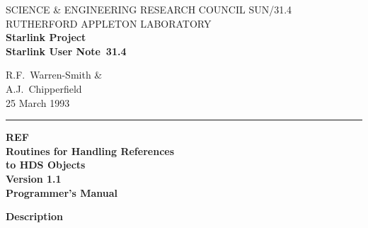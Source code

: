 \pagestyle{headings}

\newcommand{\stardoccategory}  {Starlink User Note}
\newcommand{\stardocinitials}  {SUN}
\newcommand{\stardocnumber}    {31.4}
\newcommand{\stardocauthors}   {R.F.~Warren-Smith \& \\
                                A.J.~Chipperfield}
\newcommand{\stardocdate}      {25 March 1993}
\newcommand{\stardoctitle}     {REF \\ [1ex]
                                Routines for Handling References\\
                                to HDS Objects}
\newcommand{\stardocversion}   {Version 1.1}
\newcommand{\stardocmanual}    {Programmer's Manual}

\newcommand{\stardocname}{\stardocinitials /\stardocnumber}
\markright{\stardocname}
\setlength{\textwidth}{160mm}
\setlength{\textheight}{230mm}
\setlength{\topmargin}{-2mm}
\setlength{\oddsidemargin}{0mm}
\setlength{\evensidemargin}{0mm}
\setlength{\parindent}{0mm}
\setlength{\parskip}{\medskipamount}
\setlength{\unitlength}{1mm}

\renewcommand{\_}{{\tt\char'137}}
\renewcommand{\thepage}{\roman{page}}



\thispagestyle{empty}
SCIENCE \& ENGINEERING RESEARCH COUNCIL \hfill \stardocname\\
RUTHERFORD APPLETON LABORATORY\\
{\large\bf Starlink Project\\}
{\large\bf \stardoccategory\ \stardocnumber}
\begin{flushright}
\stardocauthors\\
\stardocdate
\end{flushright}
\vspace{-4mm}
\rule{\textwidth}{0.5mm}
\vspace{5mm}
\begin{center}
{\Huge\bf  \stardoctitle \\ [2.5ex]}
{\LARGE\bf \stardocversion \\ [4ex]}
{\Huge\bf  \stardocmanual}
\end{center}
\vspace{15mm}

\begin{center}
{\Large\bf Description}
\end{center}

